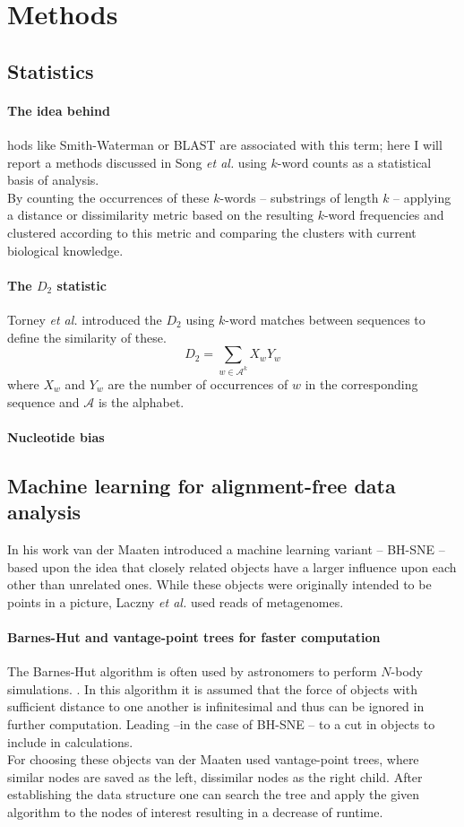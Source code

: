 \documentclass[twocolumn]{bmcart}%
\begin{document}
\section*{Methods}
\subsection*{Statistics}
\paragraph*{The idea behind}
hods like Smith-Waterman or BLAST are associated with this term; here I will report a methods discussed in Song \textit{et al.}\cite{doi:10.1093/bib/bbt067} using $k$-word counts as a statistical basis of analysis.\\
By counting the occurrences of these $k$-words -- substrings of length $k$ -- applying a distance or dissimilarity metric based on the resulting $k$-word frequencies and clustered according to this metric and comparing the clusters with current biological knowledge. 
\paragraph*{The $D_2$ statistic}
Torney \textit{et al.}\cite{torney1990computation} introduced the $D_2$  using $k$-word matches between sequences to define the similarity of these.
$$D_2=\sum_{w\in \mathcal{A}^k}X_wY_w$$
where $X_w$ and $Y_w$ are the number of occurrences of $w$ in the corresponding sequence and $ \mathcal{A}$ is the alphabet.
\paragraph*{Nucleotide bias}
\subsection*{Machine learning for alignment-free data analysis}
In his work van der Maaten\cite{DBLP:journals/corr/abs-1301-3342} introduced a machine learning variant -- BH-SNE --  based upon the idea that closely related objects have a larger influence upon each other than unrelated ones. While these objects were originally intended to be points in a picture, Laczny \textit{et al.}\cite{Laczny2014} used reads of metagenomes.\\
\paragraph*{Barnes-Hut and vantage-point trees for faster computation}
The Barnes-Hut algorithm is often used by astronomers to perform $N$-body simulations.\cite{DBLP:journals/corr/abs-1301-3342} . In this algorithm it is assumed that the force of objects with sufficient distance to one another is infinitesimal and thus can be ignored in further computation. Leading --in the case of BH-SNE -- to a cut in objects to include in calculations.\\
For choosing these objects van der Maaten used vantage-point trees, where similar nodes are saved as the left, dissimilar nodes as the right child. After establishing the data structure one can search the tree and apply the given algorithm to the nodes of interest resulting in a decrease of runtime.\\
\end{document}
